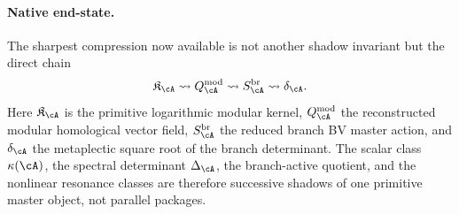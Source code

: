 \paragraph{Native end-state.}
The sharpest compression now available is not another shadow invariant but the direct chain
\[
\mathfrak K_\cA
\rightsquigarrow
Q^{\mathrm{mod}}_\cA
\rightsquigarrow
S^{\mathrm{br}}_\cA
\rightsquigarrow
\delta_\cA.
\]
Here $\mathfrak K_\cA$ is the primitive logarithmic modular kernel,
$Q^{\mathrm{mod}}_\cA$ the reconstructed modular homological vector field,
$S^{\mathrm{br}}_\cA$ the reduced branch BV master action, and
$\delta_\cA$ the metaplectic square root of the branch determinant.
The scalar class $\kappa(\cA)$, the spectral determinant $\Delta_\cA$, the branch-active quotient,
and the nonlinear resonance classes are therefore successive shadows of one primitive master object,
not parallel packages.
